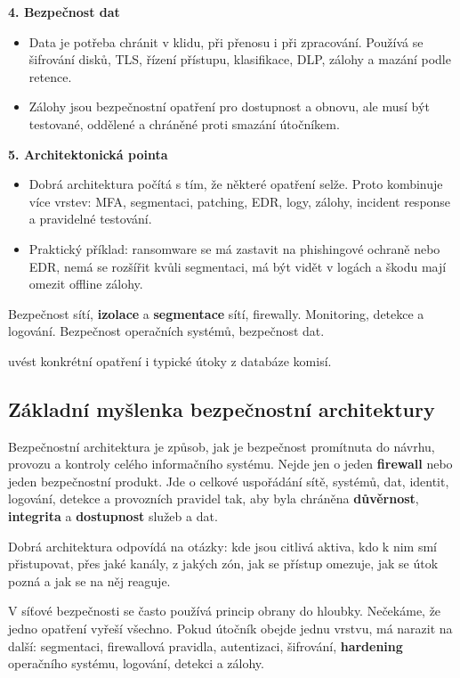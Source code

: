\textbf{4. Bezpečnost dat}
\begin{itemize}
  \item Data je potřeba chránit v klidu, při přenosu i při zpracování. Používá se šifrování disků, TLS, řízení přístupu, klasifikace, DLP, zálohy a mazání podle retence.
  \item Zálohy jsou bezpečnostní opatření pro dostupnost a obnovu, ale musí být testované, oddělené a chráněné proti smazání útočníkem.
\end{itemize}

\textbf{5. Architektonická pointa}
\begin{itemize}
  \item Dobrá architektura počítá s tím, že některé opatření selže. Proto kombinuje více vrstev: MFA, segmentaci, patching, EDR, logy, zálohy, incident response a pravidelné testování.
  \item Praktický příklad: ransomware se má zastavit na phishingové ochraně nebo EDR, nemá se rozšířit kvůli segmentaci, má být vidět v logách a škodu mají omezit offline zálohy.
\end{itemize}

Bezpečnost sítí, \textbf{izolace} a \textbf{segmentace} sítí, firewally. Monitoring, detekce a logování. Bezpečnost operačních systémů, bezpečnost dat.

uvést konkrétní opatření i typické útoky z databáze komisí.

\subsection*{Základní myšlenka bezpečnostní architektury}

Bezpečnostní architektura je způsob, jak je bezpečnost promítnuta do návrhu, provozu a kontroly celého informačního systému. Nejde jen o jeden \textbf{firewall} nebo jeden bezpečnostní produkt. Jde o celkové uspořádání sítě, systémů, dat, identit, logování, detekce a provozních pravidel tak, aby byla chráněna \textbf{důvěrnost}, \textbf{integrita} a \textbf{dostupnost} služeb a dat.

Dobrá architektura odpovídá na otázky: kde jsou citlivá aktiva, kdo k nim smí přistupovat, přes jaké kanály, z jakých zón, jak se přístup omezuje, jak se útok pozná a jak se na něj reaguje.

V síťové bezpečnosti se často používá princip obrany do hloubky. Nečekáme, že jedno opatření vyřeší všechno. Pokud útočník obejde jednu vrstvu, má narazit na další: segmentaci, firewallová pravidla, autentizaci, šifrování, \textbf{hardening} operačního systému, logování, detekci a zálohy.

